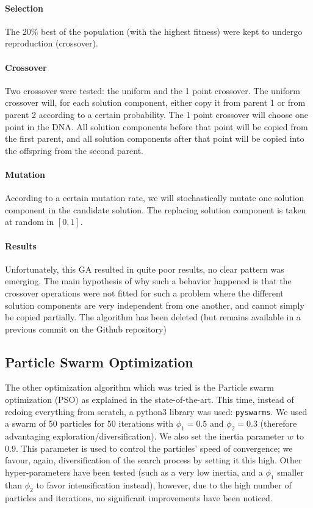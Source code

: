         \paragraph{Selection} The 20\% best of the population (with the highest fitness) were kept to undergo reproduction (crossover).

        \paragraph{Crossover} Two crossover were tested: the uniform and the 1 point crossover. The uniform crossover will, for each solution component, either copy it from parent 1 or from parent 2 according to a certain probability. The 1 point crossover will choose one point in the DNA. All solution components before that point will be copied from the first parent, and all solution components after that point will be copied into the offspring from the second parent.

        \paragraph{Mutation} According to a certain mutation rate, we will stochastically mutate one solution component in the candidate solution. The replacing solution component is taken at random in $[0, 1]$.

        \paragraph{Results} Unfortunately, this GA resulted in quite poor results, no clear pattern was emerging. The main hypothesis of why such a behavior happened is that the crossover operations were not fitted for such a problem where the different solution components are very independent from one another, and cannot simply be copied partially. The algorithm has been deleted (but remains available in a previous commit on the Github repository)

    \subsection{Particle Swarm Optimization}

    The other optimization algorithm which was tried is the Particle swarm optimization (PSO) as explained in the state-of-the-art. This time, instead of redoing everything from scratch, a python3 library was used: \texttt{pyswarms}. We used a swarm of 50 particles for 50 iterations with $\phi_1 = 0.5$ and $\phi_2 = 0.3$ (therefore advantaging exploration/diversification). We also set the inertia parameter $w$ to $0.9$. This parameter is used to control the particles' speed of convergence; we favour, again, diversification of the search process by setting it this high. \cite{psoDorigo} Other hyper-parameters have been tested (such as a very low inertia, and a $\phi_1$ smaller than $\phi_2$ to favor intensification instead), however, due to the high number of particles and iterations, no significant improvements have been noticed.
    

